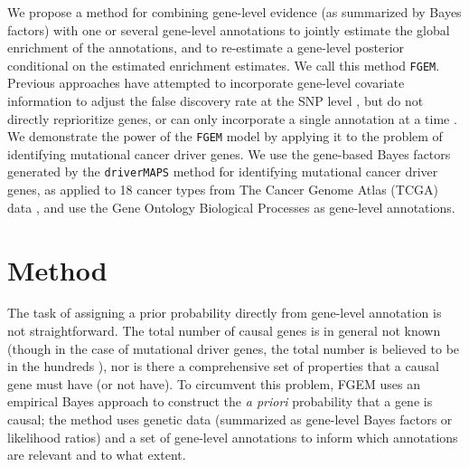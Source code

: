 We propose a method for combining gene-level evidence (as summarized by Bayes factors) with one or several gene-level annotations to jointly estimate the global enrichment of the annotations, and to re-estimate a gene-level posterior conditional on the estimated enrichment estimates. We call this method \texttt{FGEM}.  Previous approaches have attempted to incorporate gene-level covariate information to adjust the false discovery rate at the SNP level \cite{Zablocki_2014}, but do not directly reprioritize genes, or can only incorporate a single annotation at a time \cite{rss-e}.  We demonstrate the power of the \texttt{FGEM} model by applying it to the problem of identifying mutational cancer driver genes. We use the gene-based Bayes factors generated by the \texttt{driverMAPS} method for identifying mutational cancer driver genes, as applied to 18 cancer types from The Cancer Genome Atlas (TCGA) data \cite{TCGA} \cite{drivermaps}, and use the Gene Ontology Biological Processes as gene-level annotations.


\section{Method}\label{sec:org4822ac5}

The task of assigning a prior probability directly from gene-level annotation is not straightforward.  The total number of causal genes is in general not known (though in the case of mutational driver genes, the total number is believed to be in the hundreds \cite{Bailey_2018}), nor is there a comprehensive set of properties that a causal gene must have (or not have).  To circumvent this problem, FGEM uses an empirical Bayes approach to construct the \emph{a priori} probability that a gene is causal; the method uses genetic data (summarized as gene-level Bayes factors or likelihood ratios) and a set of gene-level annotations to inform which annotations are relevant and to what extent.
